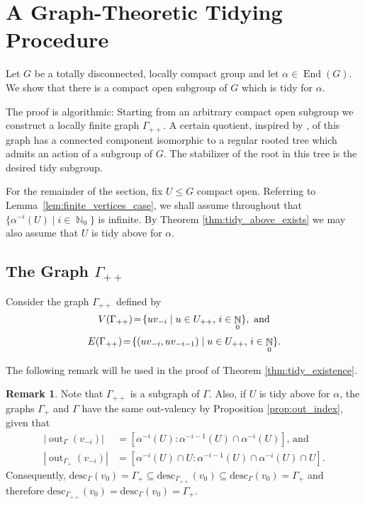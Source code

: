 \documentclass{article}
\DeclareMathOperator\End{End}
\DeclareMathOperator\out{out}
\DeclareMathOperator\bbN{\mathbb{N}}
\theoremstyle{definition}
\newtheorem{remark}[theorem]{Remark}
\begin{document}
\section{A Graph-Theoretic Tidying Procedure}\label{sec:tidying_procedure}

Let $G$ be a totally disconnected, locally compact group and let $\alpha\in\End(G)$. We show that there is a compact open subgroup of $G$ which is tidy for $\alpha$. 

The proof is algorithmic: Starting from an arbitrary compact open subgroup we construct a locally finite graph $\Gamma_{++}$. A certain quotient, inspired by \cite{Moe00}, of this graph has a connected component isomorphic to a regular rooted tree which admits an action of a subgroup of $G$. The stabilizer of the root in this tree is the desired tidy subgroup.

\vspace{0.2cm}
For the remainder of the section, fix $U\le G$ compact open. Referring to Lemma~\ref{lem:finite_vertices_case}, we shall assume throughout that $\{\alpha^{-i}(U)\mid i\in\bbN_{0}\}$ is infinite. By Theorem \ref{thm:tidy_above_exists} we may also assume that $U$ is tidy above for $\alpha$.

\subsection{The Graph $\Gamma_{++}$}
Consider the graph $\Gamma_{++}$ defined by
\[
  V(\Gamma_{++})\!=\!\{uv_{-i}\mid u\in U_{++}\hbox{, }i\in\bbN_0\}, \text{ and}
\]
\vspace{-0.45cm}
\[
  E(\Gamma_{++})\!=\!\{(uv_{-i},uv_{-i-1})\mid u\in U_{++}\hbox{, } i\in\bbN_0\}.
\]

The following remark will be used in the proof of Theorem \ref{thm:tidy_existence}.

\begin{remark}\label{rem:rel_gamma_++_gamma}
Note that $\Gamma_{++}$ is a subgraph of $\Gamma$. Also, if $U$ is tidy above for $\alpha$, the graphs $\Gamma_{+}$ and $\Gamma$ have the same out-valency by Proposition \ref{prop:out_index}, given that
\begin{align*}
|\out_{\Gamma}(v_{-i})|&=[\alpha^{-i}(U):\alpha^{-i-1}(U)\cap\alpha^{-i}(U)]\text{, and} \\
|\out_{\Gamma_{+}}(v_{-i})|&=[\alpha^{-i}(U)\cap U:\alpha^{-i-1}(U)\cap\alpha^{-i}(U)\cap U].
\end{align*}
Consequently, $\mathrm{desc}_{\Gamma}(v_{0})=\Gamma_{+}\subseteq \mathrm{desc}_{\Gamma_{++}}(v_{0})\subseteq\mathrm{desc}_{\Gamma}(v_{0})=\Gamma_{+}$
and therefore $\mathrm{desc}_{\Gamma_{++}}(v_{0})=\mathrm{desc}_{\Gamma}(v_{0})=\Gamma_{+}$.
\end{remark}
\end{document}
